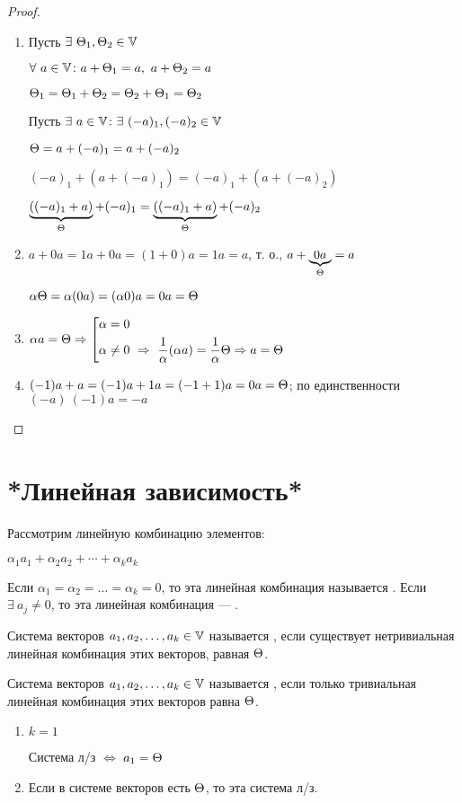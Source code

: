 \begin{proof}
\begin{enumerate}
\item Пусть $\exists\ \T_1,\T_2\in\V$

$\forall\ a\in\V\colon{}a+\T_1=a,\ a+\T_2=a$

$\Theta_1=\Theta_1+\Theta_2=\Theta_2+\Theta_1=\Theta_2$

Пусть $\exists\ a\in\V\colon\exists\ (-a)_1,(-a)_2\in\V$

$\Theta=a+(-a)_1=a+(-a)_2$

$(-a)_1+(a+(-a)_1)=(-a)_1+(a+(-a)_2)$

$\underbrace{((-a)_1+a)}_{\scriptsize\Theta}+(-a)_1=\underbrace{((-a)_1+a)}_{\scriptsize\Theta}+(-a)_2$

\item $a+0a=1a+0a=(1+0)a=1a=a$, т. о., $a+\underbrace{0a}_{\scriptsize\Theta}=a$

$\alpha\Theta=\alpha(0a)=(\alpha0)a=0a=\Theta$

\item $\alpha{}a=\T\Rightarrow\left[\begin{aligned}
& \alpha=0 \\
& \alpha\neq0\ \Rightarrow\ \frac1\alpha(\alpha{}a)=\frac1\alpha\T\Rightarrow a=\T
\end{aligned}\right.$
\item $(-1)a+a=(-1)a+1a=(-1+1)a=0a=\Theta$; по единственности $(-a)\ (-1)a=-a$
\end{enumerate}
\end{proof}
\chapter{*Линейная зависимость*}
\begin{opred}
Рассмотрим линейную комбинацию элементов:

$\alpha_1a_1+\alpha_2a_2+\cdots+\alpha_ka_k$

Если $\alpha_1=\alpha_2=\ldots=\alpha_k=0$, то эта линейная комбинация называется . Если $\exists\ a_j\neq0$, то эта линейная комбинация --- .
\end{opred}
\begin{opred}
Система векторов $a_1,a_2,\ldots,a_k\in\mathbb{V}$ называется , если существует нетривиальная линейная комбинация этих векторов, равная $\Theta$.
\end{opred}
\begin{opred}
Система векторов $a_1,a_2,\ldots,a_k\in\mathbb{V}$ называется , если только тривиальная линейная комбинация этих векторов равна $\Theta$.
\end{opred}
\begin{remark}
\begin{enumerate}
\item $k=1$

Система л/з $\Leftrightarrow$ $a_1=\Theta$
\item Если в системе векторов есть $\Theta$, то эта система л/з.
\end{enumerate}
\end{remark}
